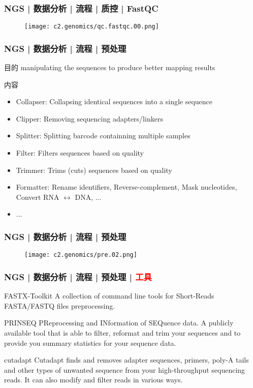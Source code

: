 \begin{frame}
  \frametitle{NGS | 数据分析 | 流程 | 质控 | FastQC}
  \begin{figure}
    \centering
    \texttt{[image: c2.genomics/qc.fastqc.00.png]}
  \end{figure}
\end{frame}

\begin{frame}
  \frametitle{NGS | 数据分析 | 流程 | 预处理}
  \begin{block}{目的}
 manipulating the sequences to produce better mapping results
  \end{block}
  \pause
  \begin{block}{内容}
    \begin{itemize}
      \item Collapser: Collapsing identical sequences into a single sequence
      \item Clipper: Removing sequencing adapters/linkers
      \item Splitter: Splitting barcode containning multiple samples
      \item Filter: Filters sequences based on quality
      \item Trimmer: Trims (cuts) sequences based on quality
      \item Formatter: Rename identifiers, Reverse-complement, Mask nucleotides, Convert RNA $\leftrightarrow$ DNA, ...
      \item ...
    \end{itemize}
  \end{block}
\end{frame}

\begin{frame}
  \frametitle{NGS | 数据分析 | 流程 | 预处理}
  \begin{figure}
    \centering
    \texttt{[image: c2.genomics/pre.02.png]}
  \end{figure}
\end{frame}

\begin{frame}
  \frametitle{NGS | 数据分析 | 流程 | 预处理 | \textcolor{red}{工具}}
  \begin{block}{FASTX-Toolkit}
    A collection of command line tools for Short-Reads FASTA/FASTQ files preprocessing.
  \end{block}
  \pause
  \begin{block}{PRINSEQ}
    PReprocessing and INformation of SEQuence data. A publicly available tool that is able to filter, reformat and trim your sequences and to provide you summary statistics for your sequence data.
  \end{block}
  \pause
  \begin{block}{cutadapt}
    Cutadapt finds and removes adapter sequences, primers, poly-A tails and other types of unwanted sequence from your high-throughput sequencing reads. It can also modify and filter reads in various ways.
  \end{block}
\end{frame}

